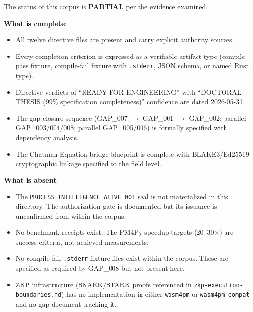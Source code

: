 The status of this corpus is \textbf{PARTIAL} per the evidence examined.

\textbf{What is complete}:
\begin{itemize}
  \item All twelve directive files are present and carry explicit authority sources.
  \item Every completion criterion is expressed as a verifiable artifact type
    (compile-pass fixture, compile-fail fixture with \texttt{.stderr}, JSON schema,
    or named Rust type).
  \item Directive verdicts of ``READY FOR ENGINEERING'' with ``DOCTORAL THESIS
    (99\% specification completeness)'' confidence are dated 2026-05-31.
  \item The gap-closure sequence (GAP\_007 $\to$ GAP\_001 $\to$ GAP\_002; parallel
    GAP\_003/004/008; parallel GAP\_005/006) is formally specified with dependency
    analysis.
  \item The Chatman Equation bridge blueprint is complete with BLAKE3/Ed25519
    cryptographic linkage specified to the field level.
\end{itemize}

\textbf{What is absent}:
\begin{itemize}
  \item The \texttt{PROCESS\_INTELLIGENCE\_ALIVE\_001} seal is not materialized in
    this directory. The authorization gate is documented but its issuance is
    unconfirmed from within the corpus.
  \item No benchmark receipts exist. The PM4Py speedup targets (20--30$\times$) are
    success criteria, not achieved measurements.
  \item No compile-fail \texttt{.stderr} fixture files exist within the corpus.
    These are specified as required by GAP\_008 but not present here.
  \item ZKP infrastructure (SNARK/STARK proofs referenced in
    \texttt{zkp-execution-boundaries.md}) has no implementation in either
    \texttt{wasm4pm} or \texttt{wasm4pm-compat} and no gap document tracking it.
\end{itemize}
